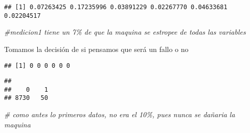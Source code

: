 \documentclass[
]{article}
\newenvironment{Shaded}{\begin{snugshade}}{\end{snugshade}}
\newcommand{\CommentTok}[1]{\textcolor[rgb]{0.56,0.35,0.01}{\textit{#1}}}
\newcommand{\DecValTok}[1]{\textcolor[rgb]{0.00,0.00,0.81}{#1}}
\newcommand{\FloatTok}[1]{\textcolor[rgb]{0.00,0.00,0.81}{#1}}
\newcommand{\FunctionTok}[1]{\textcolor[rgb]{0.00,0.00,0.00}{#1}}
\newcommand{\NormalTok}[1]{#1}
\newcommand{\OtherTok}[1]{\textcolor[rgb]{0.56,0.35,0.01}{#1}}
\newcommand{\SpecialCharTok}[1]{\textcolor[rgb]{0.00,0.00,0.00}{#1}}
\begin{document}
\begin{verbatim}
## [1] 0.07263425 0.17235996 0.03891229 0.02267770 0.04633681 0.02204517
\end{verbatim}

\begin{Shaded}
\begin{Highlighting}[]
\CommentTok{\#medicion1 tiene un 7\% de que la maquina se estropee de todas las variables}
\end{Highlighting}
\end{Shaded}

Tomamos la decisión de si pensamos que será un fallo o no

\begin{Shaded}
\end{Shaded}

\begin{verbatim}
## [1] 0 0 0 0 0 0
\end{verbatim}

\begin{Shaded}
\end{Shaded}

\begin{verbatim}
## 
##    0    1 
## 8730   50
\end{verbatim}

\begin{Shaded}
\begin{Highlighting}[]
\CommentTok{\# como antes lo primeros datos, no era el 10\%, pues nunca se dañaria la maquina}
\end{Highlighting}
\end{Shaded}
\end{document}
